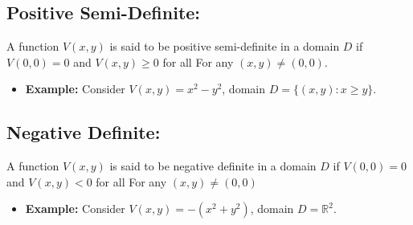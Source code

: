 \subsection*{Positive Semi-Definite:}
A function $V(x, y)$ is said to be positive semi-definite in a domain $D$ if $V(0,0) = 0$ and $V(x, y) \ge 0$ for all For any $(x, y) \neq (0, 0)$.
\begin{itemize}
    \item \textbf{Example:} Consider $V(x, y) = x^2 - y^2$, domain $D = \{(x, y) : x \ge y\}$.
\end{itemize}
\subsection*{Negative Definite:}
A function $V(x, y)$ is said to be negative definite in a domain $D$ if $V(0,0) = 0$ and $V(x, y) < 0$ for all For any $(x, y) \neq (0, 0)$
\begin{itemize}
    \item \textbf{Example:} Consider $V(x, y) = -(x^2 + y^2)$, domain $D = \mathbb{R}^2$.
\end{itemize}